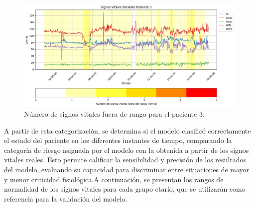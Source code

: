 \begin{figure}[H]
  \centering
  \includegraphics[width=\textwidth]{Images/patient3_signos_vitales_fuera_de_rango_2.png}
  \caption{Número de signos vitales fuera de rango para el paciente 3.}
  \label{fig:patient3_signos_vitales_fuera_de_rango}
\end{figure}

A partir de esta categorización, se determina si el modelo clasificó correctamente el estado del paciente en los diferentes instantes de tiempo, comparando la categoría de riesgo asignada por el modelo con la obtenida a partir de los signos vitales reales. Esto permite calificar la sensibilidad y precisión de los resultados del modelo, evaluando su capacidad para discriminar entre situaciones de mayor y menor criticidad fisiológica.A continuación, se presentan los rangos de normalidad de los signos vitales para cada grupo etario, que se utilizarán como referencia para la validación del modelo.

\begin{table}[H]
  \centering
  \caption{Rangos normales de signos vitales según grupo etario. ARTs: Presión arterial sistólica; ARTd: Presión arterial diastólica; FC: Frecuencia cardíaca; Resp: Frecuencia respiratoria; SpO$_2$: Saturación de oxígeno.}
  \label{tab:rangos_signos_vitales}
\end{table}

